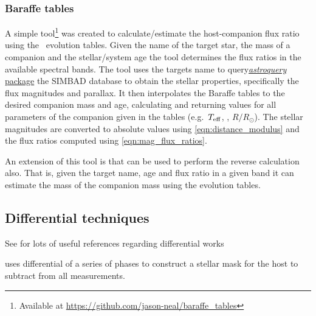\subsubsection{Baraffe tables}
\label{subsubsec:baraffe_tables_code}
A simple tool\footnote{Available at \href{https://github.com/jason-neal/baraffe_tables}{https://github.com/jason-neal/baraffe\_tables}} was created to calculate/estimate the host-companion flux ratio using the~\citet{baraffe_evolutionary_2003, baraffe_new_2015} evolution tables.
Given the name of the target star, the mass of a companion and the stellar/system age the tool determines the flux ratios in the available spectral bands.
The tool uses the targets name to query\href{https://zenodo.org/record/1160627}{\emph{astroquery} package} the {SIMBAD} database to obtain the stellar properties, specifically the flux magnitudes and parallax. It then interpolates the Baraffe tables to the desired companion mass and age, calculating and returning values for all parameters of the companion given in the tables (e.g.\ \(T_{\mathrm{eff}}\), \logg, \(R/R_{\odot}\)).
The stellar magnitudes are converted to absolute values using \cref{eqn:distance_modulus} and the flux ratios computed using \cref{eqn:mag_flux_ratios}.

An extension of this tool is that can be used to perform the reverse calculation also. That is, given the target name, age and flux ratio in a given band it can estimate the mass of the companion mass using the evolution tables.










\subsection{Differential techniques}
See \citet{kostogryz_spectral_2013} for lots of useful references regarding differential works \citet{simon_disentangling_1994}

\citet{rodler_weighing_2012} uses differential of a series of phases to construct a stellar mask for the host to subtract from all measurements.
